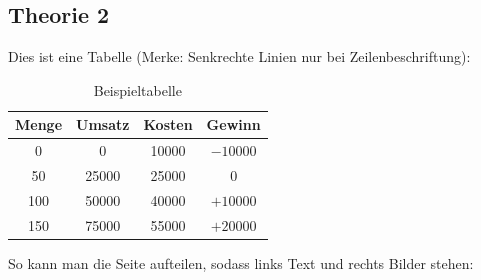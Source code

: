 \subsection{Theorie 2}
\label{sec:theorieB}

Dies ist eine Tabelle (Merke: Senkrechte Linien nur bei Zeilenbeschriftung):

\medskip
\begin{table}[!h]
	\centering
	{\renewcommand{\arraystretch}{1.5}
		\begin{tabular}{cccc}
			\toprule 
			Menge & Umsatz & Kosten & Gewinn \\ \midrule 
			0 & 0 & 10000 & $-10000$ \\ %
			50 & 25000 & 25000 & 0 \\ %
			100 & 50000 & 40000 & $+10000$ \\ %
			150 & 75000 & 55000 & $+20000$ \\
			\bottomrule 
		\end{tabular}
	}
	\caption{Beispieltabelle}
	\label{tab:BSP}
\end{table}

So kann man die Seite aufteilen, sodass links Text und rechts Bilder stehen:

\bigskip

